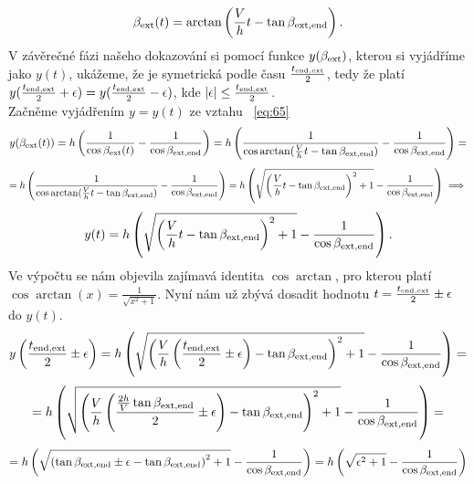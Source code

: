 \documentclass[reqno, a4paper]{amsart}
\begin{document}
\begin{equation}
	\label{eq:78}
	\beta_{\mathrm{ext}}(t)=\arctan\left( \frac{V}{h}t - \tan \beta_{\mathrm{ext}, \mathrm{end}}\right) .
\end{equation}
V závěrečné fázi našeho dokazování si pomocí funkce $y(\beta_{\mathrm{ext}})$, kterou si vyjádříme jako $y(t)$, ukážeme, že je symetrická podle času $\frac{t_{\mathrm{end}, \mathrm{ext}}}{2}$, tedy že platí $y(\frac{t_{\mathrm{end}, \mathrm{ext}}}{2}+\epsilon)=y(\frac{t_{\mathrm{end}, \mathrm{ext}}}{2}-\epsilon)$, kde $\left|\epsilon\right|\leq\frac{t_{\mathrm{end}, \mathrm{ext}}}{2}$.\\
Začněme vyjádřením $y=y(t)$ ze vztahu ~\eqref{eq:65}
\begin{equation*}
	y(\beta_{\mathrm{ext}}(t))=h
	\left(
	\frac{1}{\cos \beta_{\mathrm{ext}}(t)}
	-
	\frac{1}{\cos \beta_{\mathrm{ext}, \mathrm{end}}}
	\right)=h
	\left(
	\frac{1}{\cos \arctan(\frac{V}{h}t - \tan \beta_{\mathrm{ext}, \mathrm{end}})}
	-
	\frac{1}{\cos \beta_{\mathrm{ext}, \mathrm{end}}}
	\right)=
\end{equation*}
\begin{equation*}
	=h
	\left(
	\frac{1}{\cos \arctan(\frac{V}{h}t - \tan \beta_{\mathrm{ext}, \mathrm{end}})}
	-
	\frac{1}{\cos \beta_{\mathrm{ext}, \mathrm{end}}}
	\right)=h\left(
	\sqrt{\left( \frac{V}{h}t-\tan \beta_{\mathrm{ext}, \mathrm{end}}\right)^2 + 1 }
	-
	\frac{1}{\cos \beta_{\mathrm{ext}, \mathrm{end}}}
	\right) \implies
\end{equation*}
\begin{equation}
	\label{eq:80}
	y(t)=h\left(
	\sqrt{\left( \frac{V}{h}t-\tan \beta_{\mathrm{ext}, \mathrm{end}}\right)^2 + 1 }
	-
	\frac{1}{\cos \beta_{\mathrm{ext}, \mathrm{end}}}
	\right).
\end{equation}
Ve výpočtu se nám objevila zajímavá identita $\cos \arctan$, pro kterou platí $\cos \arctan (x)=\frac{1}{\sqrt{x^2+1}}$. Nyní nám už zbývá dosadit hodnotu $t = \frac{ t_{\mathrm{end}, \mathrm{ext}}}{2}\pm\epsilon$ do $y(t)$.
\begin{equation*}
	y\left( \frac{ t_{\mathrm{end}, \mathrm{ext}}}{2}\pm\epsilon\right) =h\left(
	\sqrt{\left( \frac{V}{h}\left( \frac{ t_{\mathrm{end}, \mathrm{ext}}}{2}\pm\epsilon\right) -\tan \beta_{\mathrm{ext}, \mathrm{end}}\right)^2 + 1 }
	-
	\frac{1}{\cos \beta_{\mathrm{ext}, \mathrm{end}}}
	\right)=
\end{equation*}
\begin{equation*}
	=h\left(
	\sqrt{\left( \frac{V}{h}\left( \frac{\frac{2h}{V}\tan\beta_{\mathrm{ext}, \mathrm{end}}}{2}\pm\epsilon\right) -\tan \beta_{\mathrm{ext}, \mathrm{end}}\right)^2 + 1 }
	-
	\frac{1}{\cos \beta_{\mathrm{ext}, \mathrm{end}}}
	\right)=
\end{equation*}
\begin{equation}
	\label{eq:81}
	=h\left(
	\sqrt{\left( \tan \beta_{\mathrm{ext}, \mathrm{end}}\pm\epsilon -\tan \beta_{\mathrm{ext}, \mathrm{end}}\right)^2 + 1 }
	-
	\frac{1}{\cos \beta_{\mathrm{ext}, \mathrm{end}}}
	\right)=h\left(\sqrt{\epsilon^2+1}-\frac{1}{\cos \beta_{\mathrm{ext}, \mathrm{end}}}
	\right)
\end{equation}
\end{document}
